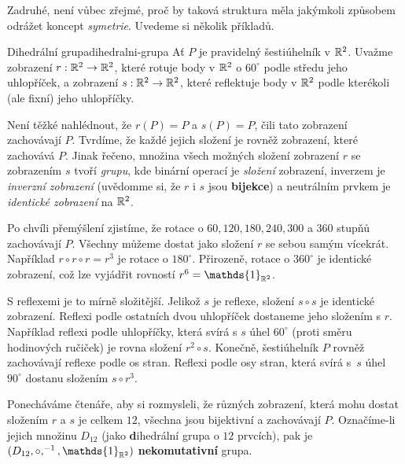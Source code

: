 Zadruhé, není vůbec zřejmé, proč by taková struktura měla jakýmkoli způsobem
odrážet koncept \emph{symetrie}. Uvedeme si několik příkladů.
\begin{example}{Dihedrální grupa}{dihedralni-grupa}
 Ať $P$ je pravidelný šestiúhelník v $\mathbb{R}^2$. Uvažme zobrazení $r:\mathbb{R}^2 \to \mathbb{R}^2$,
 které rotuje body v $\mathbb{R}^2$ o $60^{ \circ }$ podle středu jeho uhlopříček, a
 zobrazení $s:\mathbb{R}^2 \to \mathbb{R}^2$, které reflektuje body v $\mathbb{R}^2$ podle kterékoli
 (ale fixní) jeho uhlopříčky.

 Není těžké nahlédnout, že $r(P) = P$ a $s(P) = P$, čili tato zobrazení
 zachovávají $P$. Tvrdíme, že každé jejich složení je rovněž zobrazení, které
 zachovává $P$. Jinak řečeno, množina všech možných složení zobrazení $r$ se
 zobrazením $s$ tvoří \emph{grupu}, kde binární operací je \emph{složení}
 zobrazení, inverzem je \emph{inverzní zobrazení} (uvědomme si, že $r$ i $s$ jsou
 \textbf{bijekce}) a neutrálním prvkem je \emph{identické zobrazení} na $\mathbb{R}^2$.

 Po chvíli přemýšlení zjistíme, že rotace o $60,120,180,240,300$ a $360$ stupňů
 zachovávají $P$. Všechny můžeme dostat jako složení $r$ se sebou samým
 vícekrát. Například $r \circ r \circ r = r^3$ je rotace o $180^{ \circ }$.
 Přirozeně, rotace o $360^{ \circ }$ je identické zobrazení, což lze vyjádřit
 rovností $r^{6} = \mathds{1}_{\R^2}$.

 S reflexemi je to mírně složitější. Jelikož $s$ je reflexe, složení $s \circ s$
 je identické zobrazení. Reflexi podle ostatních dvou uhlopříček dostaneme jeho
 složením s $r$. Například reflexi podle uhlopříčky, která svírá s $s$ úhel
 $60^{ \circ }$ (proti směru hodinových ručiček) je rovna složení $r^2 \circ s$.
 Konečně, šestiúhelník $P$ rovněž zachovávají reflexe podle os stran. Reflexi
 podle osy stran, která svírá s~$s$ úhel $90^{ \circ }$ dostanu složením $s
 \circ r^3$.

 Ponecháváme čtenáře, aby si rozmysleli, že různých zobrazení, která mohu dostat
 složením $r$ a $s$ je celkem $12$, všechna jsou bijektivní a zachovávají $P$.
 Označíme-li jejich množinu $D_{12}$ (jako \textbf{d}ihedrální grupa o $12$
 prvcích), pak je $(D_{12}, \circ ,^{-1},\mathds{1}_{\R^2})$
 \textbf{nekomutativní} grupa.

 \begin{figure}[H]
  \centering
  \begin{subfigure}[b]{\textwidth}
   \centering
\end{subfigure}
\end{figure}
\end{example}
